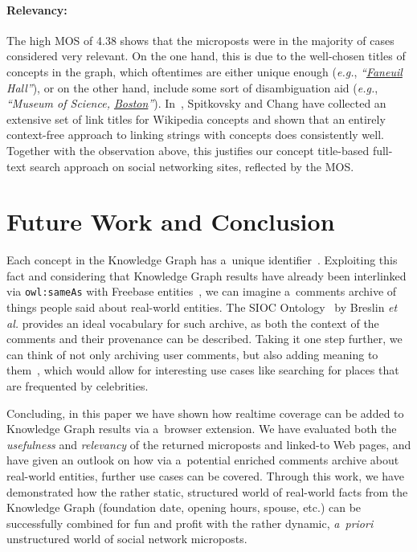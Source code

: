 \documentclass[runningheads,a4paper]{llncs}
\begin{document}
\paragraph{Relevancy:}
The high MOS of 4.38 shows that the microposts
were in the majority of cases considered very relevant.
On the one hand, this is due to the well-chosen titles of concepts in the graph,
which oftentimes are either unique enough (\emph{e.g.}, \emph{``\underline{Faneuil} Hall''}),
or on the other hand, include some sort of disambiguation aid
(\emph{e.g.}, \emph{``Museum of Science, \underline{Boston}''}).
In~\cite{spitkovsky2012}, Spitkovsky and Chang have collected
an extensive set of link titles for Wikipedia concepts
and shown that an entirely context-free approach
to linking strings with concepts does consistently well.
Together with the observation above, this justifies
our concept title-based full-text search approach on social networking sites,
reflected by the MOS.

\section{Future Work and Conclusion}
Each concept in the Knowledge Graph has a~unique identifier~\cite{thalhammer2012}.
Exploiting this fact and considering that Knowledge Graph results
have already been interlinked via \texttt{owl:sameAs}
with Freebase entities~\cite{glaser2012},
we can imagine a~comments archive of things people said about real-world entities.
The SIOC Ontology~\cite{breslin2005} by Breslin \emph{et al.}
provides an ideal vocabulary for such archive,
as both the context of the comments and their provenance can be described.
Taking it one step further, we can think of not only archiving user comments,
but also adding meaning to them~\cite{steiner2013},
which would allow for interesting use cases
like searching for places that are frequented by celebrities.

Concluding, in this paper we have shown how realtime coverage
can be added to Knowledge Graph results via a~browser extension.
We have evaluated both the \emph{usefulness} and \emph{relevancy}
of the returned microposts and linked-to Web pages,
and have given an outlook on how via a~potential enriched comments archive
about real-world entities, further use cases can be covered.
Through this work, we have demonstrated how the rather static, structured world
of real-world facts from the Knowledge Graph
(foundation date, opening hours, spouse, etc.)
can be successfully combined for fun and profit
with the rather dynamic, \emph{a~priori} unstructured world
of social network microposts.
\end{document}
